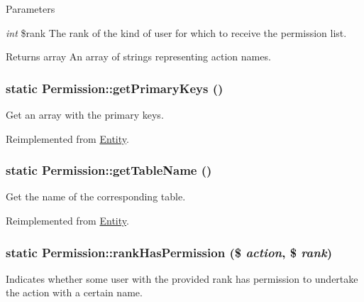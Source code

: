 \begin{DoxyParams}{Parameters}
\item[{\em int}]\$rank The rank of the kind of user for which to receive the permission list.\end{DoxyParams}
\begin{DoxyReturn}{Returns}
array An array of strings representing action names. 
\end{DoxyReturn}
\hypertarget{classPermission_a378dfdccb2df0e6d2b7bb059cd918873}{
\subsubsection[{getPrimaryKeys}]{\setlength{\rightskip}{0pt plus 5cm}static Permission::getPrimaryKeys ()}}
\label{classPermission_a378dfdccb2df0e6d2b7bb059cd918873}
Get an array with the primary keys. 

Reimplemented from \hyperlink{classEntity_a61bbfbb4058427174e002a09ddc77c41}{Entity}.

\hypertarget{classPermission_a9a6694ebca8793f08c3f3388c27e0645}{
\subsubsection[{getTableName}]{\setlength{\rightskip}{0pt plus 5cm}static Permission::getTableName ()}}
\label{classPermission_a9a6694ebca8793f08c3f3388c27e0645}
Get the name of the corresponding table. 

Reimplemented from \hyperlink{classEntity_a8305fd94740ac62cbafb9de76567ce37}{Entity}.

\hypertarget{classPermission_aaa1ea30e31b0e60dd30231e43b0af3aa}{
\subsubsection[{rankHasPermission}]{\setlength{\rightskip}{0pt plus 5cm}static Permission::rankHasPermission (\$ {\em action}, \/  \$ {\em rank})}}
\label{classPermission_aaa1ea30e31b0e60dd30231e43b0af3aa}
Indicates whether some user with the provided rank has permission to undertake the action with a certain name.


